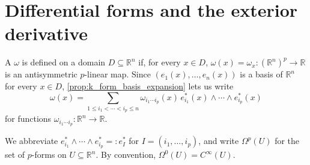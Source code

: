 
\section{Differential forms and the exterior derivative}
\label{sec:differential_forms}

\begin{definition}
\label{def:differential_p_form}
A  $\omega$  is defined on a
domain $D \subseteq \mathbb{R}^n$ if, for every $x \in D$, $\omega(x) = \omega_x : (\mathbb{R}^n)^p
\to \mathbb{R}$ is an antisymmetric $p$-linear map. Since $(e_1(x),\ldots,e_n(x))$ is a basis
of $\mathbb{R}^n$ for every $x \in D$, \cref{prop:k_form_basis_expansion} lets us write
\[\omega(x) = \sum_{1\leq i_1<\cdots<i_p\leq n} \omega_{i_1\cdots i_p}(x)\,e_{i_1}^*(x)\wedge
  \cdots\wedge e_{i_p}^*(x)\]
for functions $\omega_{i_1\cdots i_p} : \mathbb{R}^n \to \mathbb{R}$.
\end{definition}

\begin{notation}
We abbreviate $e_{i_1}^*\wedge\cdots\wedge e_{i_p}^* =: e_I^*$ for $I = (i_1,\ldots,i_p)$, and
write $\Omega^p(U)$ for the set of $p$-forms on $U \subseteq \mathbb{R}^n$. By convention,
$\Omega^0(U) = C^\infty(U)$.
\end{notation}

